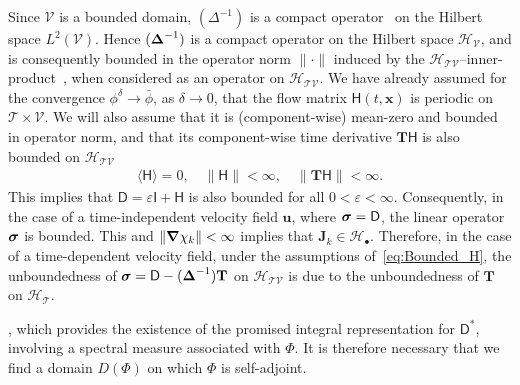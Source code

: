 \documentclass[leqno,onefignum,onetabnum]{siamltex1213}
\newcommand{\Tb}{\mathbf{T}}
\newcommand{\Tc}{\mathcal{T}}
\newcommand{\Vc}{\mathcal{V}}
\newcommand{\Hc}{\mathcal{H}}
\newcommand{\Dm}{\mathsf{D}}
\newcommand{\Hm}{\mathsf{H}}
\newcommand{\Ib}{\mathsf{I}}
\newcommand\bsig{\mbox{\boldmath${\sigma}$}}
\newcommand\bDelta{\mbox{\boldmath${\Delta}$}}
\newcommand\bnabla{\mbox{\boldmath${\nabla}$}}
\newcommand{\vecJ}{\boldsymbol{J}}
\newcommand{\vecx}{\boldsymbol{x}}
\newcommand{\vecu}{\boldsymbol{u}}
\begin{document}
Since $\Vc$ is a bounded domain, $(\Delta^{-1})$ is a compact
operator~\cite{Stakgold:BVP:2000} on the Hilbert space
$L^2(\Vc)$. Hence 
$(\bDelta^{-1})$ is a compact operator on the Hilbert space
$\Hc_{\Vc}$, and is consequently bounded in the operator norm $\|\cdot\|$
induced by the
$\Hc_{\Tc\Vc}$--inner-product~\cite{Reed-1980,Stone:64,Stakgold:BVP:2000},
when considered as an  
operator on $\Hc_{\Tc\Vc}$.  We have already assumed 
for the convergence $\phi^\delta\to\bar{\phi}$, as $\delta\to0$, that the flow matrix
$\Hm(t,\vecx)$ is periodic on $\Tc\times\Vc$. We will also assume that it
is (component-wise) mean-zero and bounded in operator norm, and that
its component-wise time derivative $\Tb\Hm$ is also bounded on
$\Hc_{\Tc\Vc}$ 
%
\begin{align}%
  \langle\Hm\rangle=0, \quad \|\Hm\|<\infty, \quad \|\Tb\Hm\|<\infty.
\end{align}
%
This implies that $\Dm=\varepsilon\Ib+\Hm$ is also bounded for all
$0<\varepsilon<\infty$. Consequently, in the case of a time-independent velocity 
field $\vecu $, where $\bsig=\Dm$, the linear operator $\bsig$ is
bounded. This and $\|\bnabla \chi_k\|<\infty$ implies that 
$\vecJ_k\in\Hc_\bullet$. Therefore, in the case of a time-dependent velocity
field, under the assumptions of~\eqref{eq:Bounded_H}, the
unboundedness of $\bsig=\Dm-(\bDelta^{-1})\Tb$ on $\Hc_{\Tc\Vc}$
is due to the unboundedness of $\Tb$ on $\Hc_{\Tc}$.   






, which provides the existence of the promised   
integral representation for $\Dm^*$, involving a spectral measure
associated with $\Phi$. It is therefore necessary that we find a
domain $D(\Phi)$ on which $\Phi$ is self-adjoint.
\end{document}
